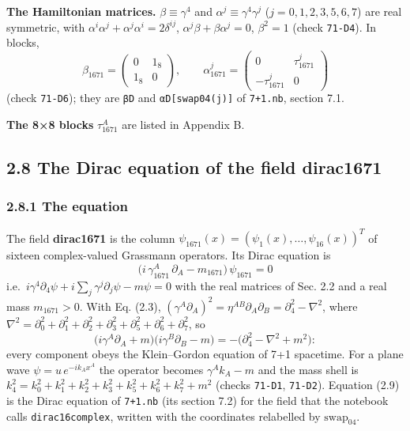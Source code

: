 \documentclass[
  10pt,
]{article}
\begin{document}
\textbf{The Hamiltonian matrices.} \(\beta\equiv\gamma^4\) and
\(\alpha^j\equiv\gamma^4\gamma^j\) (\(j=0,1,2,3,5,6,7\)) are real
symmetric, with \(\alpha^i\alpha^j+\alpha^j\alpha^i=2\delta^{ij}\),
\(\alpha^j\beta+\beta\alpha^j=0\), \(\beta^2=1\) (check \texttt{71-D4}).
In blocks,
\[\beta_{1671}=\begin{pmatrix}0&1_8\\1_8&0\end{pmatrix},\qquad\alpha_{1671}^j=\begin{pmatrix}0&\tau_{1671}^j\\-\tau_{1671}^j&0\end{pmatrix}\tag{2.7}\]
(check \texttt{71-D6}); they are \texttt{βD} and
\texttt{αD{[}swap04(j){]}} of \texttt{7+1.nb}, section 7.1.

\textbf{The 8×8 blocks} \(\tau_{1671}^A\) are listed in Appendix B.

\hypertarget{the-dirac-equation-of-the-field-dirac1671}{%
\subsection{2.8 The Dirac equation of the field
dirac1671}\label{the-dirac-equation-of-the-field-dirac1671}}

\hypertarget{the-equation-1}{%
\subsubsection{2.8.1 The equation}\label{the-equation-1}}

The field \textbf{dirac1671} is the column
\(\psi_{1671}(x)=(\psi_1(x),\dots,\psi_{16}(x))^T\) of sixteen
complex-valued Grassmann operators. Its Dirac equation is
\[\boxed{\;\big(i\,\gamma_{1671}^A\,\partial_A-m_{1671}\big)\,\psi_{1671}=0\;}\tag{2.9}\]
i.e.~\(i\gamma^4\partial_4\psi+i\sum_j\gamma^j\partial_j\psi-m\psi=0\)
with the real matrices of Sec. 2.2 and a real mass \(m_{1671}>0\). With
Eq. (2.3),
\((\gamma^A\partial_A)^2=\eta^{AB}\partial_A\partial_B=\partial_4^2-\nabla^2\),
where
\(\nabla^2=\partial_0^2+\partial_1^2+\partial_2^2+\partial_3^2+\partial_5^2+\partial_6^2+\partial_7^2\),
so
\[\big(i\gamma^A\partial_A+m\big)\big(i\gamma^B\partial_B-m\big)=-\big(\partial_4^2-\nabla^2+m^2\big) :\tag{2.10}\]
every component obeys the Klein--Gordon equation of 7+1 spacetime. For a
plane wave \(\psi=u\,e^{-ik_Ax^A}\) the operator becomes
\(\gamma^Ak_A-m\) and the mass shell is
\(k_4^2=k_0^2+k_1^2+k_2^2+k_3^2+k_5^2+k_6^2+k_7^2+m^2\) (checks
\texttt{71-D1}, \texttt{71-D2}). Equation (2.9) is the Dirac equation of
\texttt{7+1.nb} (its section 7.2) for the field that the notebook calls
\texttt{dirac16complex}, written with the coordinates relabelled by
\(\mathrm{swap}_{04}\).
\end{document}
